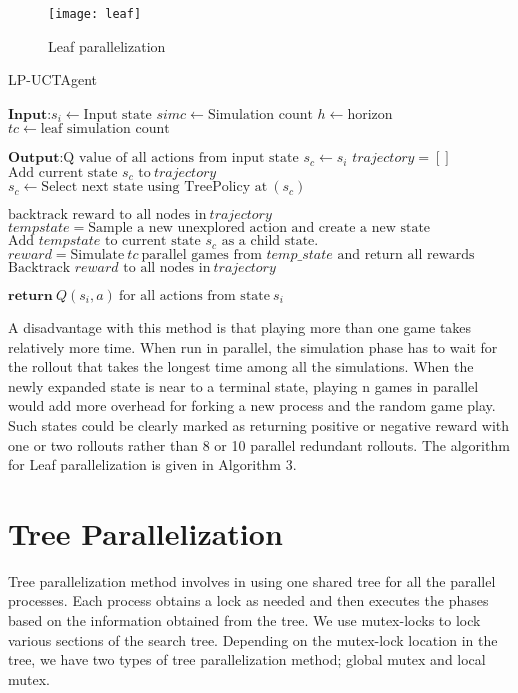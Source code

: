 \documentclass[double,12pt]{beavtex}
\begin{document}
\begin{figure}[h!]
\centering
\texttt{[image: leaf]}
\caption{Leaf parallelization}
\end{figure}

\begin{algorithm}
	\caption{LP-UCTAgent}
	\label{alg:smartmeter}
	\begin{algorithmic}[1]
		\Statex $\textbf{Input:}   s_i \leftarrow \text{Input state}$
		\Statex $simc\leftarrow \text{Simulation count}$ 
		\Statex $h\leftarrow \text{horizon}$
		\Statex $tc\leftarrow \text{leaf simulation count}$

		\Statex $\textbf{Output:}  \text{Q value of all actions from input state}$
			\State $s_c \leftarrow s_i$
			\State $trajectory = []$
				\State $\text{Add current state $s_c$ to}~trajectory$
				\State $s_c \leftarrow \text{Select next state using TreePolicy at}~(s_c)$
			\EndWhile

				\State $\text{backtrack reward to all nodes in}~trajectory$
			\Else
				\State $tempstate = \text{Sample a new unexplored action and create a new state}$
				\State $\text{Add $tempstate$ to current state $s_c$ as a child state.}$
				\State $reward = \text{Simulate}~tc~\text{parallel games from $temp\_state$ and return all rewards}$
				\State $\text{Backtrack $reward$ to all nodes in}~trajectory$
			\EndIf
		\EndFor

		\Statex $\textbf{return}~Q(s_i,a)~\text{for all actions from state}~s_i$
	\end{algorithmic}
\end{algorithm}

A disadvantage with this method is that playing more than one game takes relatively more time. When run in parallel, the simulation phase has to wait for the rollout that takes the longest time among all the simulations. When the newly expanded state is near to a terminal state, playing n games in parallel would add more overhead for forking a new process and the random game play. Such states could be clearly marked as returning positive or negative reward with one or two rollouts rather than 8 or 10 parallel redundant rollouts. The algorithm for Leaf parallelization is given in Algorithm 3.

\section{Tree Parallelization}
Tree parallelization method involves in using one shared tree for all the parallel processes. Each process obtains a lock as needed and then executes the phases based on the information obtained from the tree. We use mutex-locks to lock various sections of the search tree. Depending on the mutex-lock location in the tree, we have two types of tree parallelization method; global mutex and local mutex.
\end{document}
